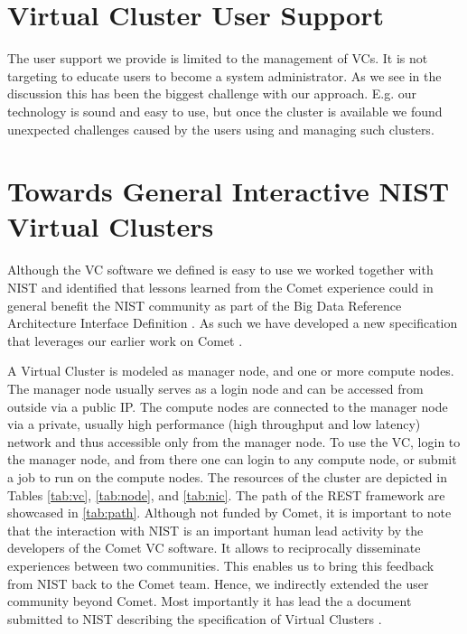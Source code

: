 \documentclass[sigconf,hyphens]{acmart}
\begin{document}
\section{Virtual Cluster User Support} \label{sec:support}

The user support we provide is limited to the management of VCs. It is
not targeting to educate users to become a system administrator. As we
see in the discussion this has been the biggest challenge with our
approach. E.g. our technology is sound and easy to use, but once the
cluster is available we found unexpected challenges caused by the
users using and managing such clusters.


\section{Towards General Interactive NIST Virtual Clusters}\label{sec:vc-nist}

Although the VC software we defined is easy to use we worked together
with NIST and identified that lessons learned from the Comet
experience could in general benefit the NIST community as part of the
Big Data Reference Architecture Interface Definition
\cite{www-vol8-v3}. As such we have developed a new specification that
leverages our earlier work on Comet \cite{comet-vc}.

A Virtual Cluster is modeled as manager node, and one or more compute
nodes. The manager node usually serves as a login node and can be
accessed from outside via a public IP. The compute nodes are connected
to the manager node via a private, usually high performance (high
throughput and low latency) network and thus accessible only from the
manager node. To use the VC, login to the manager node, and from there
one can login to any compute node, or submit a job to run on the
compute nodes. The resources of the cluster are depicted in Tables
\ref{tab:vc}, \ref{tab:node}, and \ref{tab:nic}. The path of the REST
framework are showcased in \ref{tab:path}. Although not funded by
Comet, it is important to note that the interaction with NIST is an
important human lead activity by the developers of the Comet VC
software. It allows to reciprocally disseminate experiences between
two communities. This enables us to bring this feedback from NIST back
to the Comet team. Hence, we indirectly extended the user community
beyond Comet. Most importantly it has lead the a document submitted to
NIST describing the specification of Virtual Clusters
\cite{www-vol8-v3}.
\end{document}
